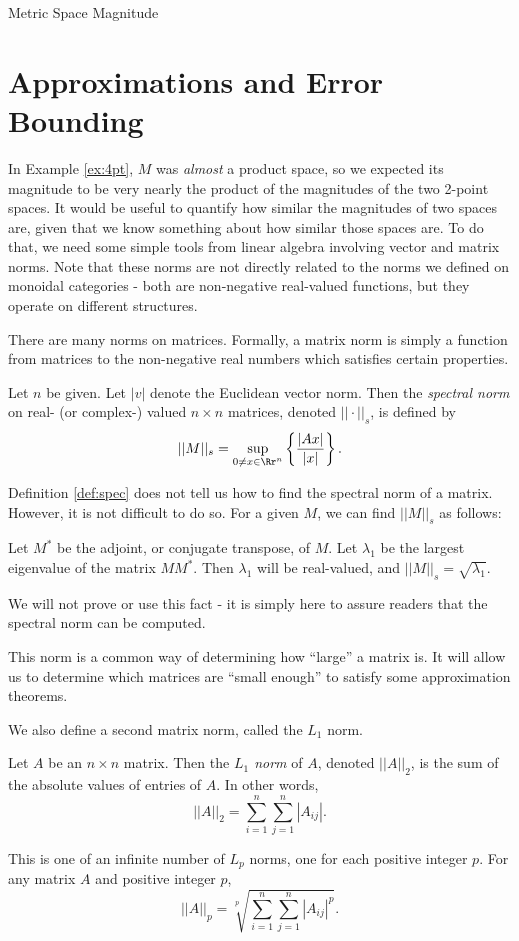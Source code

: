 \documentclass[12pt]{pom_thesis}
\begin{document}
\begin{chapter}{Metric Space Magnitude}
\section{Approximations and Error Bounding}
In Example \ref{ex:4pt}, $M$ was \emph{almost} a product space, so we expected its magnitude to be very nearly the product of the magnitudes of the two 2-point spaces. It would be useful to quantify how similar the magnitudes of two spaces are, given that we know something about how similar those spaces are. To do that, we need some simple tools from linear algebra involving vector and matrix norms. Note that these norms are not directly related to the norms we defined on monoidal categories - both are non-negative real-valued functions, but they operate on different structures.

There are many norms on matrices. Formally, a matrix norm is simply a function from matrices to the non-negative real numbers which satisfies certain properties.

\begin{defn}\label{def:spec}
Let $n$ be given. Let $|v|$ denote the Euclidean vector norm. Then the \emph{spectral norm} on real- (or complex-) valued $n \times n$ matrices, denoted $||\cdot ||_s$, is defined by
\[
||M||_s = \sup_{0 \neq x \in \Rr^n}\left\{ \frac{|Ax|}{|x|} \right\}.
\]
\end{defn}
\begin{rmk}
Definition \ref{def:spec} does not tell us how to find the spectral norm of a matrix. However, it is not difficult to do so. For a given $M$, we can find $||M||_s$ as follows:

Let $M^*$ be the adjoint, or conjugate transpose, of $M$. Let $\lambda_1$ be the largest eigenvalue of the matrix $MM^*$. Then $\lambda_1$ will be real-valued, and $||M||_s=\sqrt{\lambda_1}$. 

We will not prove or use this fact - it is simply here to assure readers that the spectral norm can be computed.
\end{rmk}
This norm is a common way of determining how ``large'' a matrix is. It will allow us to determine which matrices are ``small enough'' to satisfy some approximation theorems.

We also define a second matrix norm, called the $L_1$ norm.
\begin{defn}
Let $A$ be an $n \times n$ matrix. Then the \emph{$L_1$ norm} of $A$, denoted $||A||_2$, is the sum of the absolute values of entries of $A$. In other words,
\[
||A||_2 = \sum_{i = 1}^n\sum_{j = 1}^n |A_{ij}|.
\]
\end{defn}
\begin{rmk}
This is one of an infinite number of $L_p$ norms, one for each positive integer $p$. For any matrix $A$ and positive integer $p$, 
\[
||A||_p = \sqrt[p]{\sum_{i = 1}^n\sum_{j = 1}^n |A_{ij}|^p}.
\]
\end{rmk}



\end{chapter}
\end{document}

